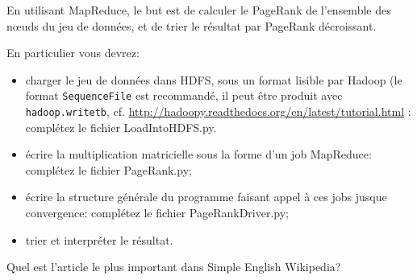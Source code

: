 \documentclass[pdftex,a4paper,DIV15]{scrartcl}
\begin{document}
En utilisant MapReduce, le but est de calculer
le PageRank de l'ensemble des n\oe{}uds du jeu de données, et de trier le
résultat par PageRank décroissant.

En particulier vous devrez:
\begin{itemize}
  \item charger le jeu de données dans HDFS, sous un format lisible par
    Hadoop (le format \texttt{SequenceFile} est recommandé, il peut
    être produit avec \texttt{hadoop.writetb}, cf.
    \url{http://hadoopy.readthedocs.org/en/latest/tutorial.html} : complétez le fichier LoadIntoHDFS.py.
  \item écrire la multiplication matricielle sous la forme d'un job
    MapReduce: complétez le fichier PageRank.py;
  \item écrire la structure générale du programme faisant appel à ces
    jobs jusque convergence: complétez le fichier PageRankDriver.py;
  \item trier et interpréter le résultat.
\end{itemize}

Quel est l'article le plus important dans Simple English Wikipedia?
\end{document}
